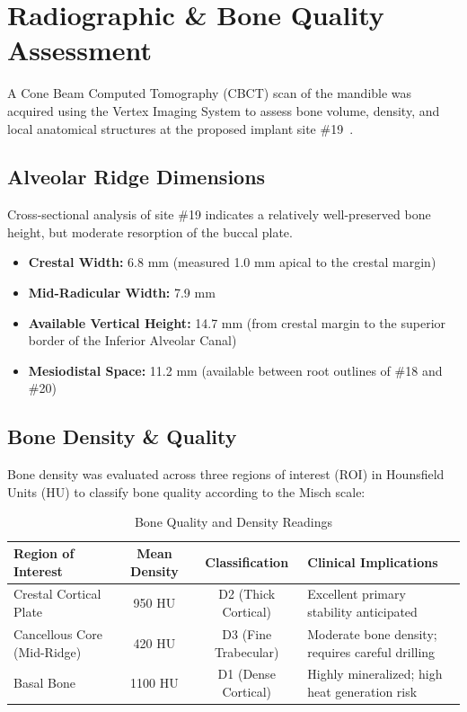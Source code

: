 \section{Radiographic \& Bone Quality Assessment}

A Cone Beam Computed Tomography (CBCT) scan of the mandible was acquired using the Vertex Imaging System to assess bone volume, density, and local anatomical structures at the proposed implant site \#19~\cite{buser2017implant}.

\subsection{Alveolar Ridge Dimensions}
Cross-sectional analysis of site \#19 indicates a relatively well-preserved bone height, but moderate resorption of the buccal plate.
\begin{itemize}
    \item \textbf{Crestal Width:} 6.8 mm (measured 1.0 mm apical to the crestal margin)
    \item \textbf{Mid-Radicular Width:} 7.9 mm
    \item \textbf{Available Vertical Height:} 14.7 mm (from crestal margin to the superior border of the Inferior Alveolar Canal)
    \item \textbf{Mesiodistal Space:} 11.2 mm (available between root outlines of \#18 and \#20)
\end{itemize}

\subsection{Bone Density \& Quality}
Bone density was evaluated across three regions of interest (ROI) in Hounsfield Units (HU) to classify bone quality according to the Misch scale:
\begin{table}[H]
\centering
\caption{Bone Quality and Density Readings}
\label{tab:bone_density}
\begin{tabularx}{\textwidth}{l c c X}
\toprule
\textbf{Region of Interest} & \textbf{Mean Density} & \textbf{Classification} & \textbf{Clinical Implications} \\
\midrule
Crestal Cortical Plate & 950 HU & D2 (Thick Cortical) & Excellent primary stability anticipated \\
Cancellous Core (Mid-Ridge) & 420 HU & D3 (Fine Trabecular) & Moderate bone density; requires careful drilling \\
Basal Bone & 1100 HU & D1 (Dense Cortical) & Highly mineralized; high heat generation risk \\
\bottomrule
\end{tabularx}
\end{table}

